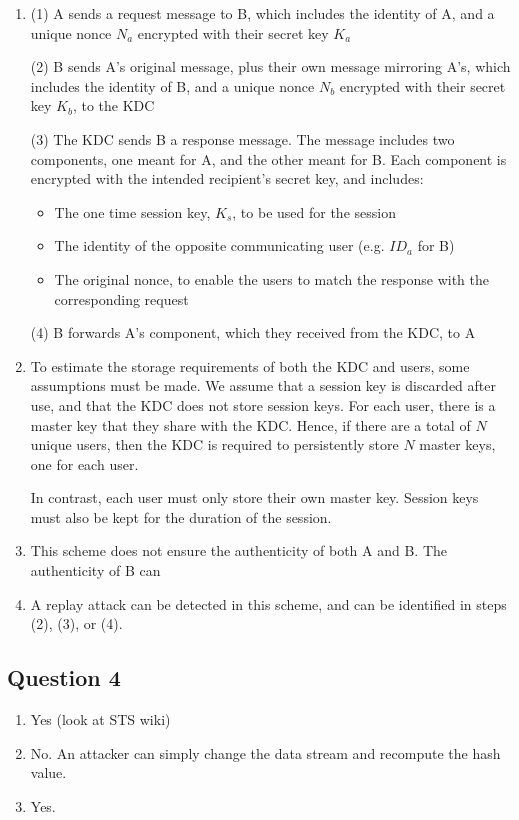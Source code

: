\documentclass[12pt]{article}
\begin{document}
\begin{enumerate}
\item (1) A sends a request message to B, which includes the identity of A, and a unique nonce $N_{a}$
encrypted with their secret key $K_{a}$

(2) B sends A's original message, plus their own message mirroring A's, which includes the identity of B,
and a unique nonce $N_{b}$ encrypted with their secret key $K_{b}$, to the KDC

(3) The KDC sends B a response message. The message includes two components, one meant for A, and the other meant for B.
Each component is encrypted with the intended recipient's secret key, and includes:
\begin{itemize}
	\item The one time session key, $K_{s}$, to be used for the session
	\item The identity of the opposite communicating user (e.g. $ID_{a}$ for B)
	\item The original nonce, to enable the users to match the response with the corresponding request
\end{itemize}

(4) B forwards A's component, which they received from the KDC, to A 


\item To estimate the storage requirements of both the KDC and users, some assumptions must be made.
We assume that a session key is discarded after use, and that the KDC does not store session keys. For each
user, there is a master key that they share with the KDC. Hence, if there are a total of $N$ unique users, then
the KDC is required to persistently store $N$ master keys, one for each user.

In contrast, each user must only store their own master key. Session keys must also be kept for the
duration of the session.

\item This scheme does not ensure the authenticity of both A and B. The authenticity of B can

\item A replay attack can be detected in this scheme, and can be identified in steps (2), (3), or (4).

\end{enumerate}

\subsection*{Question 4}
\begin{enumerate}
\item Yes (look at STS wiki)

\item No. An attacker can simply change the data stream and recompute the hash value.

\item Yes.
\end{enumerate}
\end{document}
